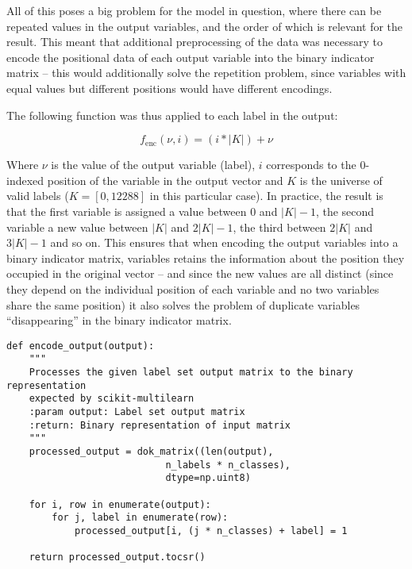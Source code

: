 \documentclass{kthreport}
\theoremstyle{definition}
\begin{document}
All of this poses a big problem for the model in question, where there can be repeated values in the output variables, and the order of which is relevant for the result. This meant that additional preprocessing of the data was necessary to encode the positional data of each output variable into the binary indicator matrix -- this would additionally solve the repetition problem, since variables with equal values but different positions would have different encodings.

The following function was thus applied to each label in the output:

\[ f_{\text{enc}}(\nu, i) = (i * |K|) + \nu \]

Where $\nu$ is the value of the output variable (label), $i$ corresponds to the $0$-indexed position of the variable in the output vector and $K$ is the universe of valid labels ($K = [0, 12288]$ in this particular case). 
In practice, the result is that the first variable is assigned a value between $0$ and $|K| - 1$, the second variable a new value between $|K|$ and $2|K| - 1$, the third between $2|K|$ and $3|K| - 1$ and so on. 
This ensures that when encoding the output variables into a binary indicator matrix, variables retains the information about the position they occupied in the original vector -- and since the new values are all distinct (since they depend on the individual position of each variable and no two variables share the same position) it also solves the problem of duplicate variables ``disappearing'' in the binary indicator matrix.

\begin{figure*}[thb]
	\begin{lstlisting}[style=MyPython, caption={Encoding function in Python. This function both transforms the given output label matrix using $f_{\text{enc}}$ and encodes the result into a binary indicator matrix.}]
def encode_output(output):
	"""
	Processes the given label set output matrix to the binary representation
	expected by scikit-multilearn
	:param output: Label set output matrix
	:return: Binary representation of input matrix
	"""
	processed_output = dok_matrix((len(output), 
							n_labels * n_classes), 
							dtype=np.uint8)
	
	for i, row in enumerate(output):
		for j, label in enumerate(row):
			processed_output[i, (j * n_classes) + label] = 1
	
	return processed_output.tocsr()
		\end{lstlisting}
\end{figure*}
\end{document}
